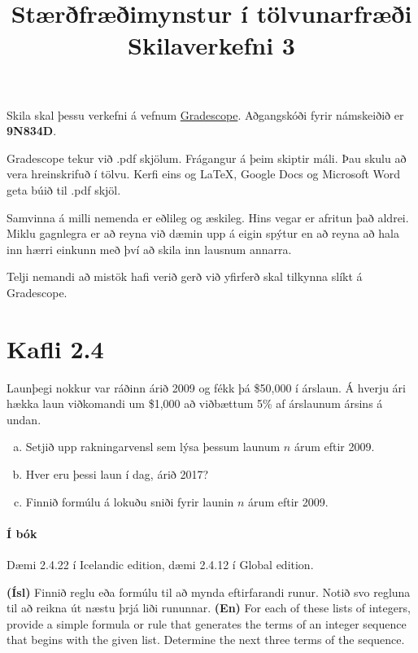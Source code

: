 \documentclass{article}
\title{Stærðfræðimynstur í tölvunarfræði \\ Skilaverkefni 3}
\author{}
\begin{document}
\maketitle

Skila skal þessu verkefni á vefnum \href{https://gradescope.com/courses/9487}{Gradescope}. Aðgangskóði fyrir námskeiðið er \textbf{9N834D}.

Gradescope tekur við .pdf skjölum. Frágangur á þeim skiptir máli. Þau skulu að vera hreinskrifuð í tölvu. Kerfi eins og \LaTeX, Google Docs og Microsoft Word geta búið til .pdf skjöl.

Samvinna á milli nemenda er eðlileg og æskileg. Hins vegar er afritun það aldrei. Miklu gagnlegra er að reyna við dæmin upp á eigin spýtur en að reyna að hala inn hærri einkunn með því að skila inn lausnum annarra.

Telji nemandi að mistök hafi verið gerð við yfirferð skal tilkynna slíkt á Gradescope.

\section{Kafli 2.4}

\question

Launþegi nokkur var ráðinn árið 2009 og fékk þá \$50,000 í árslaun. Á hverju ári hækka laun viðkomandi um \$1,000 að viðbættum 5\% af árslaunum ársins á undan.

\begin{enumerate}[a)]
    \item Setjið upp rakningarvensl sem lýsa þessum launum $n$ árum eftir 2009.
    \item Hver eru þessi laun í dag, árið 2017?
    \item Finnið formúlu á lokuðu sniði fyrir launin $n$ árum eftir 2009.
\end{enumerate}

\paragraph{Í bók} Dæmi 2.4.22 í Icelandic edition, dæmi 2.4.12 í Global edition.

\question

\textbf{(Ísl)} Finnið reglu eða formúlu til að mynda eftirfarandi runur. Notið svo regluna til að reikna út næstu þrjá liði rununnar. \textbf{(En)}  For each of these lists of integers, provide a simple formula or rule that generates the terms of an integer sequence that begins with the given list. Determine the next three terms of the sequence.
\end{document}
